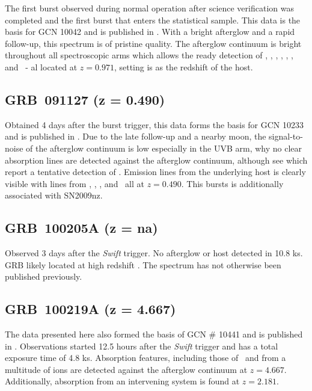 \documentclass{aa}    %
\begin{document}
The first burst observed during normal operation after science verification was
completed and the first burst that enters the statistical sample. This data is
the basis for GCN 10042 \citep{GCN10042} and is
published in \citet{Wiersema2012}. With a bright afterglow and a rapid
follow-up, this spectrum is of pristine quality. The afterglow continuum is
bright throughout all spectroscopic arms which allows the ready detection of
\alii, \aliii, \feii, \mnii, \mgii, \mgi, and \caii~- al located at $z = 0.971$,
setting is as the redshift of the host.

\subsection{GRB~091127 (z = 0.490)} \label{091127}

Obtained 4 days after the burst trigger, this data forms the basis for GCN 10233
\citep{GCN10233} and is published in \citet{Vergani2011}. Due to the late
follow-up and a nearby moon, the signal-to-noise of the afterglow continuum is
low especially in the UVB arm, why no clear absorption lines are detected
against the afterglow continuum, although see \citet{Vergani2011} which report a
tentative detection of \mgii. Emission lines from the underlying host is clearly
visible with lines from \oii, \hb, \oiii, and \ha~all at $z = 0.490$. This
bursts is additionally associated with SN2009nz.

\subsection{GRB~100205A  (z = na)} \label{100205}

Observed 3 days after the \textit{Swift} trigger. No afterglow or host detected
in 10.8 ks. GRB likely located at high
redshift \citep[GCN GCN10399;][]{GCN10399}. The spectrum
has not otherwise been published previously.

\subsection{GRB~100219A (z = 4.667)} \label{100219}

The data presented here also formed the basis of GCN \#
10441 \citep{GCN10441} and is published
in \citet{Thone2013}. Observations started 12.5 hours after the \textit{Swift}
trigger and has a total exposure time of 4.8 ks. Absorption features, including
those of \lya~and from a multitude of ions are detected against the afterglow
continuum at $z = 4.667$. Additionally, absorption from an intervening system
is found at $z = 2.181$.
\end{document}
